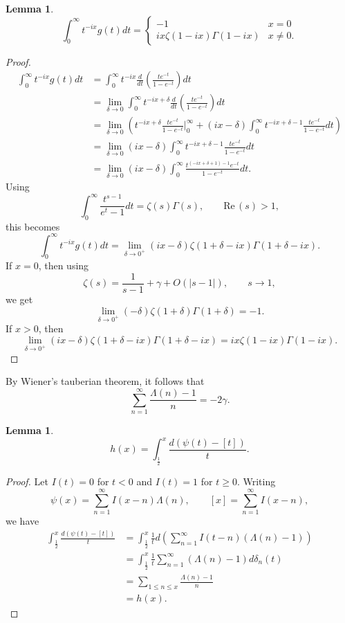 \documentclass{amsart}
\def\Re{\ensuremath{\mathrm{Re}}\,}
\newtheorem{lemma}[theorem]{Lemma}
\begin{document}
\begin{lemma}
\[
\int_0^\infty t^{-ix} g(t) dt =\begin{cases}
-1&x=0\\
 ix \zeta(1-ix)\Gamma(1-ix)&x \neq 0.
 \end{cases}
\]
\end{lemma}
\begin{proof}
\begin{align*}
\int_0^\infty t^{-ix} g(t) dt&=\int_0^\infty t^{-ix}  \frac{d}{dt} \left( \frac{te^{-t}}{1-e^{-t}} \right) dt\\
&=\lim_{\delta \to 0} \int_0^\infty t^{-ix+\delta}  \frac{d}{dt} \left( \frac{te^{-t}}{1-e^{-t}} \right) dt\\
&=\lim_{\delta \to 0} \left( t^{-ix+\delta} \frac{te^{-t}}{1-e^{-t}} \bigg |_0^\infty 
+(ix-\delta) \int_0^\infty  t^{-ix+\delta-1} \frac{te^{-t}}{1-e^{-t}} dt \right)\\
&=\lim_{\delta \to 0} (ix-\delta)  \int_0^\infty  t^{-ix+\delta-1} \frac{te^{-t}}{1-e^{-t}} dt\\
&=\lim_{\delta \to 0} (ix-\delta)  \int_0^\infty   \frac{t^{(-ix+\delta+1)-1}e^{-t}}{1-e^{-t}} dt.
\end{align*}
Using
\[
\int_0^\infty \frac{t^{s-1}}{e^t-1} dt = \zeta(s) \Gamma(s), \qquad \Re(s)>1,
\]
this becomes
\[
\int_0^\infty t^{-ix} g(t) dt=\lim_{\delta \to 0^+} (ix-\delta) \zeta(1+\delta-ix)\Gamma(1+\delta-ix).
\]
If $x=0$, then
using 
\[
\zeta(s) = \frac{1}{s-1}+\gamma +O(|s-1|), \qquad s \to 1,
\]
we get
\[
\lim_{\delta \to 0^+} (-\delta) \zeta(1+\delta)\Gamma(1+\delta) = -1.
\]
If $x>0$, then
\[
\lim_{\delta \to 0^+} (ix-\delta) \zeta(1+\delta-ix)\Gamma(1+\delta-ix) = 
ix\zeta(1-ix)\Gamma(1-ix).
\]
\end{proof}


By Wiener's tauberian theorem, it follows that
\[
\sum_{n=1}^\infty \frac{\Lambda(n)-1}{n} = -2\gamma.
\]

\begin{lemma}
\[
h(x) = \int_{\frac{1}{2}}^x \frac{d(\psi(t)-[t])}{t}.
\]
\end{lemma}
\begin{proof}
Let $I(t)=0$ for $t < 0$ and $I(t)=1$ for $t \geq 0$. Writing
\[
\psi(x) = \sum_{n=1}^\infty I(x-n) \Lambda(n),
\qquad [x]=
\sum_{n=1}^\infty I(x-n),
\]
we have
\begin{align*}
 \int_{\frac{1}{2}}^x \frac{d(\psi(t)-[t])}{t}
&= \int_{\frac{1}{2}}^x 
\frac{1}{t} d\left(\sum_{n=1}^\infty I(t-n) (\Lambda(n)-1)\right)\\
&= \int_{\frac{1}{2}}^x  \frac{1}{t} 
\sum_{n=1}^\infty (\Lambda(n)-1) d \delta_n(t)\\
&=\sum_{1 \leq n \leq x} \frac{\Lambda(n)-1}{n}\\
&=h(x).
\end{align*}
\end{proof}
\end{document}
